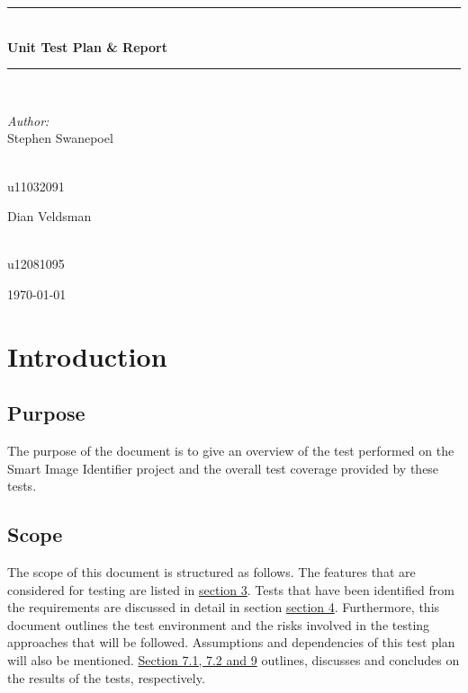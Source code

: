 \documentclass[a4paper,12pt]{report}
\newcommand{\HRule}{\rule{\linewidth}{0.5mm}}
\begin{document}
\begin{titlepage}
\begin{center}
\HRule \\[0.4cm]
{ \huge \bfseries Unit Test Plan \& Report}\\[0.4cm]
\HRule \\[0.4cm]
\begin{minipage}{0.4\textwidth}
\begin{flushleft} \large
\emph{Author:}\\
Stephen {Swanepoel}
\end{flushleft}
\end{minipage}
\begin{minipage}{0.4\textwidth}
\begin{flushright} \large
\emph{} \\
u11032091
\end{flushright}
\end{minipage}
\begin{minipage}{0.4\textwidth}
\begin{flushleft} \large
Dian {Veldsman}
\end{flushleft}
\end{minipage}
\begin{minipage}{0.4\textwidth}
\begin{flushright} \large
\emph{} \\
u12081095
\end{flushright}
\end{minipage}


{\large \today}
\end{center}
\end{titlepage}
\footnotesize
\normalsize

\tableofcontents

\renewcommand{\thesection}{\arabic{section}}
\newpage

\section {Introduction}
	\subsection {Purpose}
		The purpose of the document is to give an overview of the test performed on the Smart Image Identifier project and the overall test coverage provided by these tests.
	\subsection {Scope}
		The scope of this document is structured as follows. The features that are considered for
		testing are listed in \hyperref[sec:Features]{section 3}. Tests that have been identified from the requirements are
		discussed in detail in section  \hyperref[sec:Cases]{section 4}. Furthermore, this document outlines the test environment
		and the risks involved in the testing approaches that will be followed. Assumptions and
		dependencies of this test plan will also be mentioned.  \hyperref[sec:Results]{Section 7.1, 7.2 and 9} outlines,
		discusses and concludes on the results of the tests, respectively.
\end{document}
